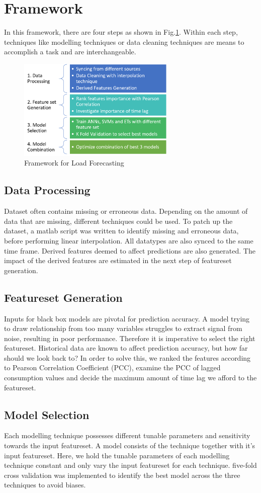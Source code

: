 \documentclass[conference]{IEEEtran}
\begin{document}
\section{Framework}\label{frame}
In this framework, there are four steps as shown in Fig.\ref{framework}.
Within each step, techniques like modelling techniques or data cleaning techniques are means to accomplish a task and are interchangeable.
\begin{figure}[htb!]\centering \footnotesize
	\includegraphics[width=75mm]{Framework1}
	\caption{Framework for Load Forecasting}
	\label{framework}
\end{figure} 
\subsection{Data Processing}
Dataset often contains missing or erroneous data. Depending on the amount of data that are missing, different techniques could be used\cite{cleophas2016}. To patch up the dataset, a matlab script was written to identify missing and erroneous data, before performing linear interpolation. All datatypes are also synced to the same time frame. Derived features deemed to affect predictions are also generated. The impact of the derived features are estimated in the next step of featureset generation.
\subsection{Featureset Generation} 
Inputs for black box models are pivotal for prediction accuracy. A model trying to draw relationship from too many variables struggles to extract signal from noise, resulting in poor performance. Therefore it is imperative to select the right featureset. Historical data are known to affect prediction accuracy, but how far should we look back to? In order to solve this, we ranked the features according to Pearson Correlation Coefficient (PCC), examine the PCC of lagged consumption values and decide the maximum amount of time lag we afford to the featureset.
\subsection{Model Selection}
Each modelling technique possesses different tunable parameters and sensitivity towards the input featureset. A model consists of the technique together with it's input featureset. Here, we hold the tunable parameters of each modelling technique constant and only vary the input featureset for each technique. five-fold cross validation\cite{zhang1993} was implemented to identify the best model across the three techniques to avoid biases.  
\end{document}
